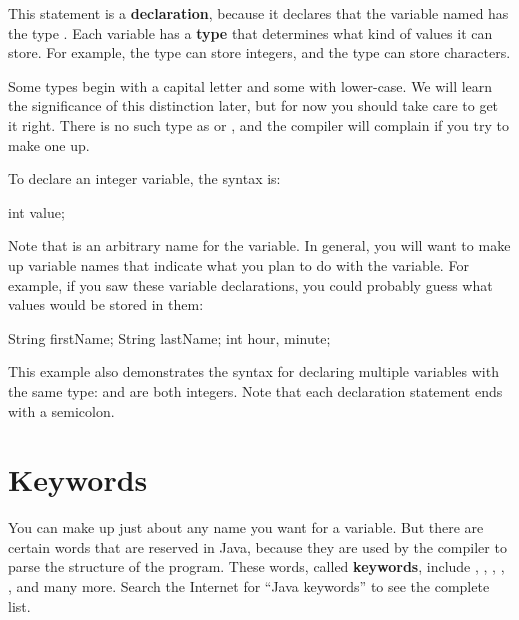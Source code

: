 
This statement is a {\bf declaration}, because it declares that the variable named  has the type .
Each variable has a {\bf type} that determines what kind of values it can store.
For example, the  type can store integers, and the  type can store characters.

Some types begin with a capital letter and some with lower-case.
We will learn the significance of this distinction later, but for now you should take care to get it right.
There is no such type as  or , and the compiler will complain if you try to make one up.

To declare an integer variable, the syntax is:

\begin{code}
    int value;
\end{code}

Note that  is an arbitrary name for the variable.
In general, you will want to make up variable names that indicate what you plan to do with the variable.
For example, if you saw these variable declarations, you could probably guess what values would be stored in them:

\begin{code}
    String firstName;
    String lastName;
    int hour, minute;
\end{code}

This example also demonstrates the syntax for declaring multiple variables with the same type:  and  are both integers.
Note that each declaration statement ends with a semicolon.


\section{Keywords}

You can make up just about any name you want for a variable.
But there are certain words that are reserved in Java, because they are used by the compiler to parse the structure of the program.
These words, called {\bf keywords}, include , , , , , and many more.
Search the Internet for ``Java keywords'' to see the complete list.


